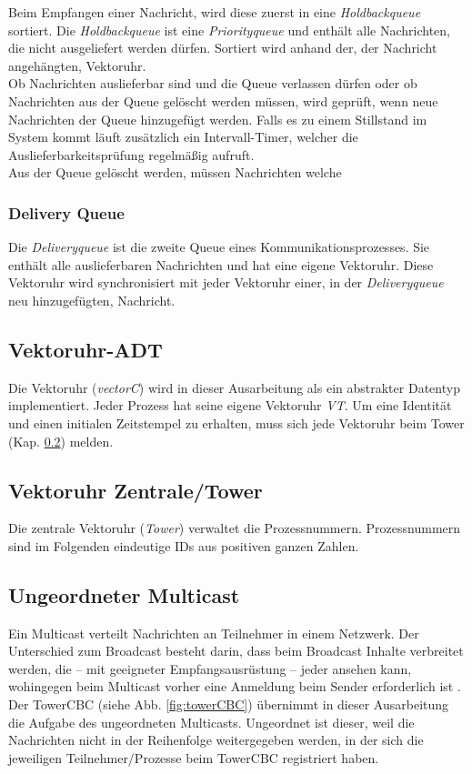 Beim Empfangen einer Nachricht, wird diese zuerst in eine \textit{Holdbackqueue} sortiert. Die \textit{Holdbackqueue} ist eine \textit{Priorityqueue} und enthält alle Nachrichten, die nicht ausgeliefert werden dürfen. Sortiert wird anhand der, der Nachricht angehängten, Vektoruhr.
\\Ob Nachrichten auslieferbar sind und die Queue verlassen dürfen oder ob Nachrichten aus der Queue gelöscht werden müssen, wird geprüft, wenn neue Nachrichten der Queue hinzugefügt werden. Falls es zu einem Stillstand im System kommt läuft zusätzlich ein Intervall-Timer, welcher die Auslieferbarkeitsprüfung regelmäßig aufruft.
\\Aus der Queue gelöscht werden, müssen Nachrichten welche %

\subsubsection{Delivery Queue}

Die \textit{Deliveryqueue} ist die zweite Queue eines Kommunikationsprozesses. Sie enthält alle auslieferbaren Nachrichten und hat eine eigene Vektoruhr. Diese Vektoruhr wird synchronisiert mit jeder Vektoruhr einer, in der \textit{Deliveryqueue} neu hinzugefügten, Nachricht. 

\subsection{Vektoruhr-ADT}

Die Vektoruhr (\textit{vectorC}) wird in dieser Ausarbeitung als ein abstrakter Datentyp implementiert. Jeder Prozess hat seine eigene Vektoruhr \textit{VT}. Um eine Identität und einen initialen Zeitstempel zu erhalten, muss sich jede Vektoruhr beim Tower (Kap. \ref{tower}) melden.

\subsection{Vektoruhr Zentrale/Tower} \label{tower}

Die zentrale Vektoruhr (\textit{Tower}) verwaltet die Prozessnummern. Prozessnummern sind im Folgenden eindeutige IDs aus positiven ganzen Zahlen.

\subsection{Ungeordneter Multicast}

Ein Multicast verteilt Nachrichten an Teilnehmer in einem Netzwerk. Der Unterschied zum Broadcast besteht darin, dass beim Broadcast Inhalte verbreitet werden, die – mit geeigneter Empfangsausrüstung – jeder ansehen kann, wohingegen beim Multicast vorher eine Anmeldung beim Sender erforderlich ist \cite{wiki:Multicast}.\\
Der TowerCBC (siehe Abb. \ref{fig:towerCBC}) übernimmt in dieser Ausarbeitung die Aufgabe des ungeordneten Multicasts. Ungeordnet ist dieser, weil die Nachrichten nicht in der Reihenfolge weitergegeben werden, in der sich die jeweiligen Teilnehmer/Prozesse beim TowerCBC registriert haben.

